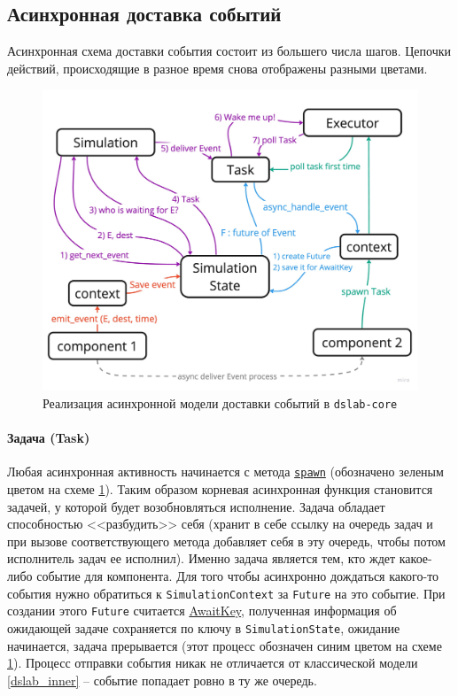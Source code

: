 \subsection{Асинхронная доставка событий}
Асинхронная схема доставки события состоит из большего числа шагов. Цепочки действий, происходящие в разное время снова отображены разными цветами. 
\nopagebreak
\begin{figure}[H]
    \centering
    \includegraphics[width=\linewidth]{images/async-dslab-core-new.pdf}
    \caption{Реализация асинхронной модели доставки событий в \texttt{dslab-core}}
    \label{async_dslab_inner}
\end{figure}

\paragraph{Задача (Task)}
Любая асинхронная активность начинается с метода \hyperref[spawn]{\texttt{spawn}} (обозначено зеленым цветом на схеме \ref{async_dslab_inner}). Таким образом корневая асинхронная функция становится задачей, у которой будет возобновляться исполнение. Задача обладает способностью <<разбудить>> себя (хранит в себе ссылку на очередь задач и при вызове соответствующего метода добавляет себя в эту очередь, чтобы потом исполнитель задач ее исполнил). Именно задача является тем, кто ждет какое-либо событие для компонента. Для того чтобы асинхронно дождаться какого-то события нужно обратиться к \texttt{SimulationContext} за \texttt{Future} на это событие. При создании этого \texttt{Future} считается \hyperref[awaitkey]{AwaitKey}, полученная информация об ожидающей задаче сохраняется по ключу в \texttt{SimulationState}, ожидание начинается, задача прерывается (этот процесс обозначен синим цветом на схеме \ref{async_dslab_inner}). Процесс отправки события никак не отличается от классической модели \ref{dslab_inner}  -- событие попадает ровно в ту же очередь.

